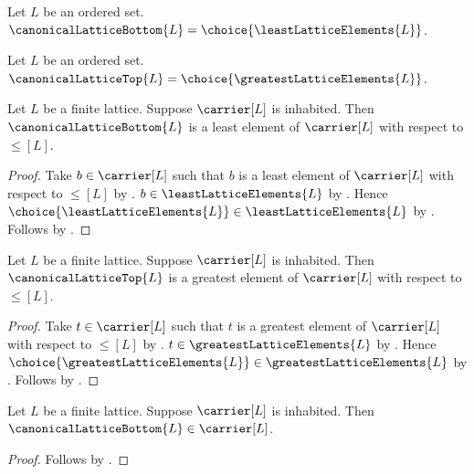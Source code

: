 \begin{definition}\label{canonical_lattice_bottom}
    Let $L$ be an ordered set.
    $\canonicalLatticeBottom{L}=\choice{\leastLatticeElements{L}}$.
\end{definition}

\begin{definition}\label{canonical_lattice_top}
    Let $L$ be an ordered set.
    $\canonicalLatticeTop{L}=\choice{\greatestLatticeElements{L}}$.
\end{definition}

\begin{theorem}\label{canonical_lattice_bottom_is_least}
    Let $L$ be a finite lattice.
    Suppose $\carrier[L]$ is inhabited.
    Then $\canonicalLatticeBottom{L}$ is a least element of $\carrier[L]$
        with respect to $\leq[L]$.
\end{theorem}
\begin{proof}
    Take $b\in\carrier[L]$ such that
        $b$ is a least element of $\carrier[L]$ with respect to $\leq[L]$
        by .
    $b\in\leastLatticeElements{L}$ by .
    Hence $\choice{\leastLatticeElements{L}}\in\leastLatticeElements{L}$ by
        .
    Follows by .
\end{proof}

\begin{theorem}\label{canonical_lattice_top_is_greatest}
    Let $L$ be a finite lattice.
    Suppose $\carrier[L]$ is inhabited.
    Then $\canonicalLatticeTop{L}$ is a greatest element of $\carrier[L]$
        with respect to $\leq[L]$.
\end{theorem}
\begin{proof}
    Take $t\in\carrier[L]$ such that
        $t$ is a greatest element of $\carrier[L]$ with respect to $\leq[L]$
        by .
    $t\in\greatestLatticeElements{L}$ by
        .
    Hence $\choice{\greatestLatticeElements{L}}
        \in\greatestLatticeElements{L}$ by .
    Follows by .
\end{proof}

\begin{proposition}\label{canonical_lattice_bottom_type}
    Let $L$ be a finite lattice.
    Suppose $\carrier[L]$ is inhabited.
    Then $\canonicalLatticeBottom{L}\in\carrier[L]$.
\end{proposition}
\begin{proof}
    Follows by .
\end{proof}

